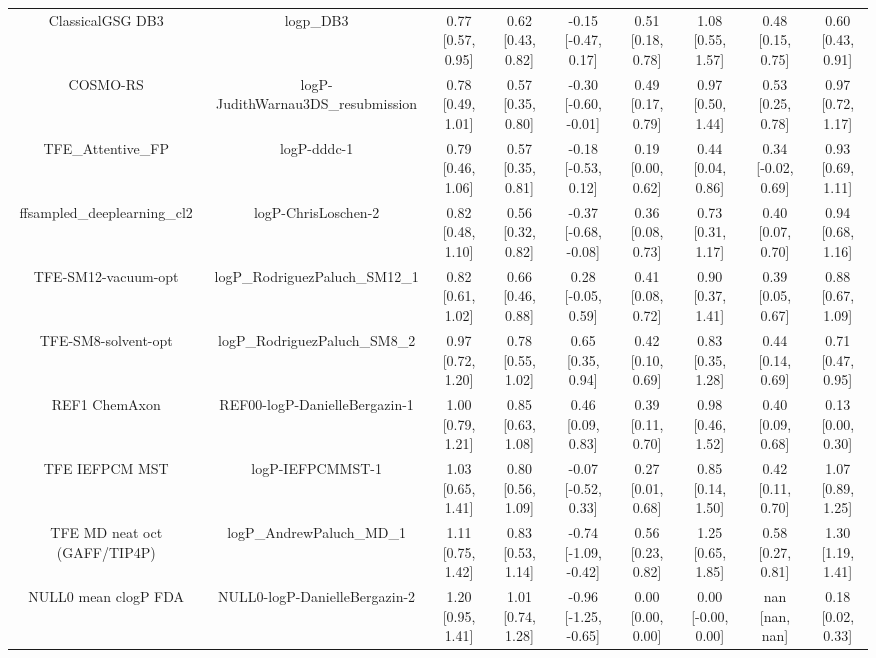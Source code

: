 \documentclass{article}
\begin{document}
\begin{center}
\begin{longtable}{|ccccccccc|}
             ClassicalGSG DB3 &                                      logp\_DB3 &  0.77 [0.57, 0.95] &  0.62 [0.43, 0.82] &   -0.15 [-0.47, 0.17] &  0.51 [0.18, 0.78] &     1.08 [0.55, 1.57] &     0.48 [0.15, 0.75] &     0.60 [0.43, 0.91] \\
                     COSMO-RS &             logP-JudithWarnau3DS\_resubmission &  0.78 [0.49, 1.01] &  0.57 [0.35, 0.80] &  -0.30 [-0.60, -0.01] &  0.49 [0.17, 0.79] &     0.97 [0.50, 1.44] &     0.53 [0.25, 0.78] &     0.97 [0.72, 1.17] \\
             TFE_Attentive_FP &                                    logP-dddc-1 &  0.79 [0.46, 1.06] &  0.57 [0.35, 0.81] &   -0.18 [-0.53, 0.12] &  0.19 [0.00, 0.62] &     0.44 [0.04, 0.86] &    0.34 [-0.02, 0.69] &     0.93 [0.69, 1.11] \\
   ffsampled_deeplearning_cl2 &                            logP-ChrisLoschen-2 &  0.82 [0.48, 1.10] &  0.56 [0.32, 0.82] &  -0.37 [-0.68, -0.08] &  0.36 [0.08, 0.73] &     0.73 [0.31, 1.17] &     0.40 [0.07, 0.70] &     0.94 [0.68, 1.16] \\
          TFE-SM12-vacuum-opt &                 logP\_RodriguezPaluch\_SM12\_1 &  0.82 [0.61, 1.02] &  0.66 [0.46, 0.88] &    0.28 [-0.05, 0.59] &  0.41 [0.08, 0.72] &     0.90 [0.37, 1.41] &     0.39 [0.05, 0.67] &     0.88 [0.67, 1.09] \\
          TFE-SM8-solvent-opt &                  logP\_RodriguezPaluch\_SM8\_2 &  0.97 [0.72, 1.20] &  0.78 [0.55, 1.02] &     0.65 [0.35, 0.94] &  0.42 [0.10, 0.69] &     0.83 [0.35, 1.28] &     0.44 [0.14, 0.69] &     0.71 [0.47, 0.95] \\
                REF1 ChemAxon &                  REF00-logP-DanielleBergazin-1 &  1.00 [0.79, 1.21] &  0.85 [0.63, 1.08] &     0.46 [0.09, 0.83] &  0.39 [0.11, 0.70] &     0.98 [0.46, 1.52] &     0.40 [0.09, 0.68] &     0.13 [0.00, 0.30] \\
               TFE IEFPCM MST &                               logP-IEFPCMMST-1 &  1.03 [0.65, 1.41] &  0.80 [0.56, 1.09] &   -0.07 [-0.52, 0.33] &  0.27 [0.01, 0.68] &     0.85 [0.14, 1.50] &     0.42 [0.11, 0.70] &     1.07 [0.89, 1.25] \\
 TFE MD neat oct (GAFF/TIP4P) &                      logP\_AndrewPaluch\_MD\_1 &  1.11 [0.75, 1.42] &  0.83 [0.53, 1.14] &  -0.74 [-1.09, -0.42] &  0.56 [0.23, 0.82] &     1.25 [0.65, 1.85] &     0.58 [0.27, 0.81] &     1.30 [1.19, 1.41] \\
         NULL0 mean clogP FDA &                  NULL0-logP-DanielleBergazin-2 &  1.20 [0.95, 1.41] &  1.01 [0.74, 1.28] &  -0.96 [-1.25, -0.65] &  0.00 [0.00, 0.00] &    0.00 [-0.00, 0.00] &        nan [nan, nan] &     0.18 [0.02, 0.33] \\

\end{longtable}
\end{center}
\end{document}
